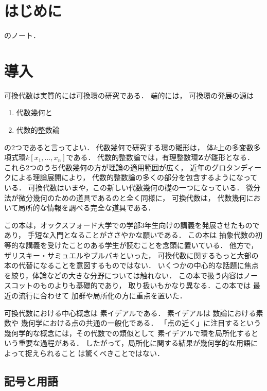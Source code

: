 \maketitle
\layout
\chapter*{はじめに}
\cite{AM69}のノート．
\tableofcontents

\chapter*{導入}
可換代数は実質的には可換環の研究である．
端的には，
可換環の発展の源は 
\begin{enumerate}[(1)]
    \item 代数幾何と
    \item 代数的整数論
\end{enumerate}
の2つであると言ってよい．
代数幾何で研究する環の雛形は，
体\(k\)上の多変数多項式環\(k[x_1,\dots,x_n]\)である．
代数的整数論では，有理整数環\(\mathbf{Z}\)が雛形となる．
これら2つのうち代数幾何の方が理論の適用範囲が広く，
近年のグロタンディークによる理論展開により，
代数的整数論の多くの部分を包含するようになっている．
可換代数はいまや，この新しい代数幾何の礎の一つになっている．
微分法が微分幾何のための道具であるのと全く同様に，
可換代数は，
代数幾何において局所的な情報を調べる完全な道具である．

この本は，オックスフォード大学での学部3年生向けの講義を発展させたものであり，
手短な入門となることがささやかな願いである．
この本は
抽象代数の初等的な講義を受けたことのある学生が読むことを念頭に置いている．
他方で，ザリスキー・サミュエルやブルバキといった，
可換代数に関するもっと大部の本の代替になることを意図するものではない．
いくつかの中心的な話題に焦点を絞り，体論などの大きな分野については触れない．
この本で扱う内容はノースコットのものよりも基礎的であり，
取り扱いもかなり異なる．この本では
最近の流行に合わせて
加群や局所化の方に重点を置いた．

可換代数における中心概念は
素イデアルである．
素イデアルは
数論における素数や
幾何学における点の共通の一般化である．
「点の近く」に注目するという幾何学的な概念には，その代数での類似として
素イデアルで環を局所化するという重要な過程がある．
したがって，局所化に関する結果が幾何学的な用語によって捉えられること
は驚くべきことではない．

\section*{記号と用語}

